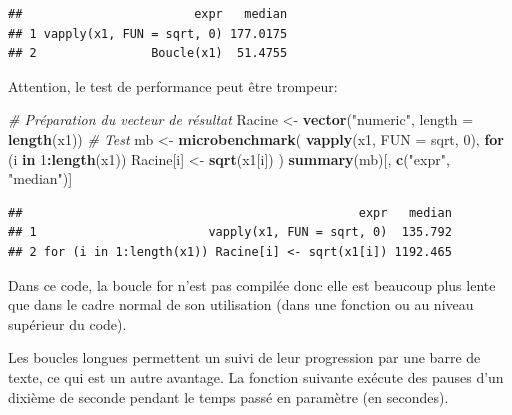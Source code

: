 \documentclass[
  12pt,
  french,
  a4paper,
  extrafontsizes,onecolumn,openright
  ]{memoir}
\newenvironment{Shaded}{\begin{snugshade}}{\end{snugshade}}
\newcommand{\AttributeTok}[1]{\textcolor[rgb]{0.13,0.29,0.53}{#1}}
\newcommand{\CommentTok}[1]{\textcolor[rgb]{0.56,0.35,0.01}{\textit{#1}}}
\newcommand{\ControlFlowTok}[1]{\textcolor[rgb]{0.13,0.29,0.53}{\textbf{#1}}}
\newcommand{\DecValTok}[1]{\textcolor[rgb]{0.00,0.00,0.81}{#1}}
\newcommand{\FunctionTok}[1]{\textcolor[rgb]{0.13,0.29,0.53}{\textbf{#1}}}
\newcommand{\NormalTok}[1]{#1}
\newcommand{\OtherTok}[1]{\textcolor[rgb]{0.56,0.35,0.01}{#1}}
\newcommand{\SpecialCharTok}[1]{\textcolor[rgb]{0.81,0.36,0.00}{\textbf{#1}}}
\newcommand{\StringTok}[1]{\textcolor[rgb]{0.31,0.60,0.02}{#1}}
\newlength{\rf}
\begin{document}
\begin{verbatim}
##                        expr   median
## 1 vapply(x1, FUN = sqrt, 0) 177.0175
## 2                Boucle(x1)  51.4755
\end{verbatim}

\normalsize

Attention, le test de performance peut être trompeur:

\scriptsize

\begin{Shaded}
\begin{Highlighting}[]
\CommentTok{\# Préparation du vecteur de résultat}
\NormalTok{Racine }\OtherTok{\textless{}{-}} \FunctionTok{vector}\NormalTok{(}\StringTok{"numeric"}\NormalTok{, }\AttributeTok{length =} \FunctionTok{length}\NormalTok{(x1))}
\CommentTok{\# Test}
\NormalTok{mb }\OtherTok{\textless{}{-}} \FunctionTok{microbenchmark}\NormalTok{(}
  \FunctionTok{vapply}\NormalTok{(x1, }\AttributeTok{FUN =}\NormalTok{ sqrt, }\DecValTok{0}\NormalTok{), }
  \ControlFlowTok{for}\NormalTok{ (i }\ControlFlowTok{in} \DecValTok{1}\SpecialCharTok{:}\FunctionTok{length}\NormalTok{(x1)) Racine[i] }\OtherTok{\textless{}{-}} \FunctionTok{sqrt}\NormalTok{(x1[i])}
\NormalTok{)}
\FunctionTok{summary}\NormalTok{(mb)[, }\FunctionTok{c}\NormalTok{(}\StringTok{"expr"}\NormalTok{, }\StringTok{"median"}\NormalTok{)]}
\end{Highlighting}
\end{Shaded}

\begin{verbatim}
##                                               expr   median
## 1                        vapply(x1, FUN = sqrt, 0)  135.792
## 2 for (i in 1:length(x1)) Racine[i] <- sqrt(x1[i]) 1192.465
\end{verbatim}

\normalsize

Dans ce code, la boucle for n'est pas compilée donc elle est beaucoup plus lente que dans le cadre normal de son utilisation (dans une fonction ou au niveau supérieur du code).

Les boucles longues permettent un suivi de leur progression par une barre de texte, ce qui est un autre avantage.
La fonction suivante exécute des pauses d'un dixième de seconde pendant le temps passé en paramètre (en secondes).

\scriptsize
\end{document}
